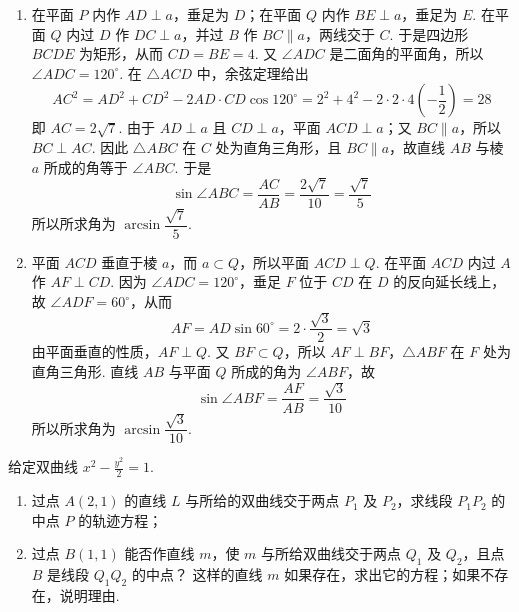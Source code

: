 \documentclass[UTF8,a4paper,oneside,11pt]{ctexbook}
\begin{document}
\begin{solution}
\begin{enumerate}
\item 在平面 \(P\) 内作 \(AD\perp a\)，垂足为 \(D\)；在平面 \(Q\) 内作 \(BE\perp a\)，垂足为 \(E\). 在平面 \(Q\) 内过 \(D\) 作 \(DC\perp a\)，并过 \(B\) 作 \(BC\parallel a\)，两线交于 \(C\). 于是四边形 \(BCDE\) 为矩形，从而 \(CD=BE=4\). 又 \(\angle ADC\) 是二面角的平面角，所以 \(\angle ADC=120^\circ\). 在 \(\triangle ACD\) 中，余弦定理给出
\[
AC^2=AD^2+CD^2-2AD\cdot CD\cos120^\circ=2^2+4^2-2\cdot2\cdot4\left(-\frac12\right)=28
\]
即 \(AC=2\sqrt7\). 由于 \(AD\perp a\) 且 \(CD\perp a\)，平面 \(ACD\perp a\)；又 \(BC\parallel a\)，所以 \(BC\perp AC\). 因此 \(\triangle ABC\) 在 \(C\) 处为直角三角形，且 \(BC\parallel a\)，故直线 \(AB\) 与棱 \(a\) 所成的角等于 \(\angle ABC\). 于是
\[
\sin\angle ABC=\frac{AC}{AB}=\frac{2\sqrt7}{10}=\frac{\sqrt7}{5}
\]
所以所求角为 \(\arcsin\dfrac{\sqrt7}{5}\).
\item 平面 \(ACD\) 垂直于棱 \(a\)，而 \(a\subset Q\)，所以平面 \(ACD\perp Q\). 在平面 \(ACD\) 内过 \(A\) 作 \(AF\perp CD\). 因为 \(\angle ADC=120^\circ\)，垂足 \(F\) 位于 \(CD\) 在 \(D\) 的反向延长线上，故 \(\angle ADF=60^\circ\)，从而
\[
AF=AD\sin60^\circ=2\cdot\frac{\sqrt3}{2}=\sqrt3
\]
由平面垂直的性质，\(AF\perp Q\). 又 \(BF\subset Q\)，所以 \(AF\perp BF\)，\(\triangle ABF\) 在 \(F\) 处为直角三角形. 直线 \(AB\) 与平面 \(Q\) 所成的角为 \(\angle ABF\)，故
\[
\sin\angle ABF=\frac{AF}{AB}=\frac{\sqrt3}{10}
\]
所以所求角为 \(\arcsin\dfrac{\sqrt3}{10}\).
\end{enumerate}
\end{solution}

\begin{problem}
给定双曲线 \(x^{2}-\frac{y^{2}}{2}=1\).

\begin{enumerate}
\item 过点 \(A(2,1)\) 的直线 \(L\) 与所给的双曲线交于两点 \(P_{1}\) 及 \(P_{2}\)，求线段 \(P_{1}P_{2}\) 的中点 \(P\) 的轨迹方程；
\item 过点 \(B(1,1)\) 能否作直线 \(m\)，使 \(m\) 与所给双曲线交于两点 \(Q_{1}\) 及 \(Q_{2}\)，且点 \(B\) 是线段 \(Q_{1}Q_{2}\) 的中点？ 这样的直线 \(m\) 如果存在，求出它的方程；如果不存在，说明理由.
\end{enumerate}
\end{problem}
\end{document}
